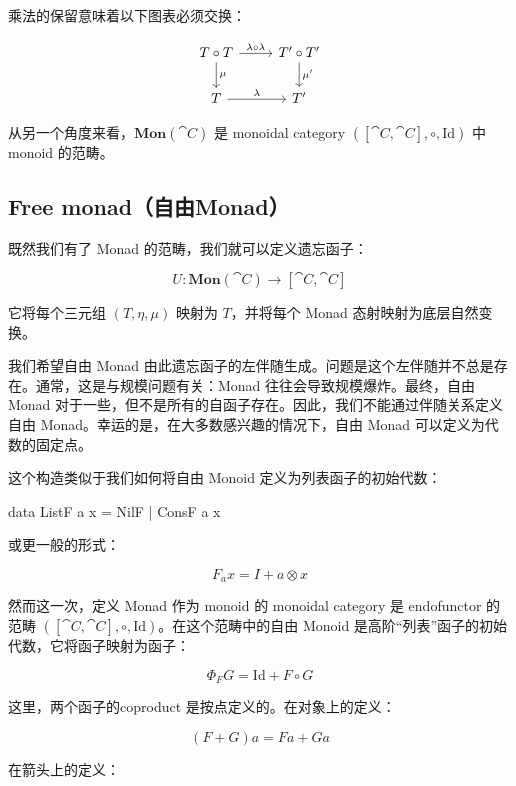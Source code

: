 \documentclass[DaoFP]{subfiles}
\begin{document}
    乘法的保留意味着以下图表必须交换：

    \[
        \begin{tikzcd}
            T \circ T
            \arrow[r, "\lambda \circ \lambda"]
            \arrow[d, "\mu"]
            & T' \circ T'
            \arrow[d, "\mu'"]
            \\
            T
            \arrow[r, "\lambda"]
            & T'
        \end{tikzcd}
    \]

    从另一个角度来看，$\mathbf{Mon}(\cat C)$ 是 monoidal category $([\cat C, \cat C], \circ, \text{Id})$ 中 monoid 的范畴。

    \subsection{Free monad（自由Monad）}

    既然我们有了 Monad 的范畴，我们就可以定义遗忘函子：

    \[ U \colon \mathbf{Mon}(\cat C) \to [\cat C, \cat C] \]

    它将每个三元组 $(T, \eta, \mu)$ 映射为 $T$，并将每个 Monad 态射映射为底层自然变换。

    我们希望自由 Monad 由此遗忘函子的左伴随生成。问题是这个左伴随并不总是存在。通常，这是与规模问题有关：Monad 往往会导致规模爆炸。最终，自由 Monad 对于一些，但不是所有的自函子存在。因此，我们不能通过伴随关系定义自由 Monad。幸运的是，在大多数感兴趣的情况下，自由 Monad 可以定义为代数的固定点。

    这个构造类似于我们如何将自由 Monoid 定义为列表函子的初始代数：

    \begin{haskell}
        data ListF a x = NilF | ConsF a x
    \end{haskell}

    或更一般的形式：

    \[ F_a x = I + a \otimes x \]

    然而这一次，定义 Monad 作为 monoid 的 monoidal category 是 endofunctor 的范畴 $([\cat C, \cat C], \circ, \text{Id})$。在这个范畴中的自由 Monoid 是高阶“列表”函子的初始代数，它将函子映射为函子：

    \[ \Phi_F G = \text{Id} + F \circ G \]

    这里，两个函子的coproduct 是按点定义的。在对象上的定义：

    \[ (F + G) a = F a + G a \]

    在箭头上的定义：
\end{document}

